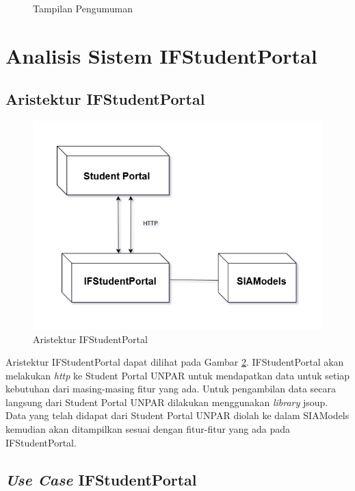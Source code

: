 \begin{enumerate}
\begin{figure}[H]
		\caption{Tampilan Pengumuman}
		\label{fig:studentportal_pengumuman}
	\end{figure}
\end{enumerate}

\section{Analisis Sistem IFStudentPortal}

\subsection{Aristektur IFStudentPortal}
	\begin{figure}[H]
			\centering
			\includegraphics[scale=0.5]{Gambar/arsitektur_ifstudentportal}
			\caption{Aristektur IFStudentPortal} 
			\label{fig:3_ars_portal}
		\end{figure}
Aristektur IFStudentPortal dapat dilihat pada Gambar \ref{fig:3_ars_portal}. IFStudentPortal akan melakukan \textit{http} ke Student Portal UNPAR untuk mendapatkan data untuk setiap kebutuhan dari masing-masing fitur yang ada. Untuk pengambilan data secara langsung dari Student Portal UNPAR dilakukan menggunakan \textit{library} jsoup. Data yang telah didapat dari Student Portal UNPAR diolah ke dalam SIAModels kemudian akan ditampilkan sesuai dengan fitur-fitur yang ada pada IFStudentPortal.
 
\subsection{\textit{Use Case} IFStudentPortal}

